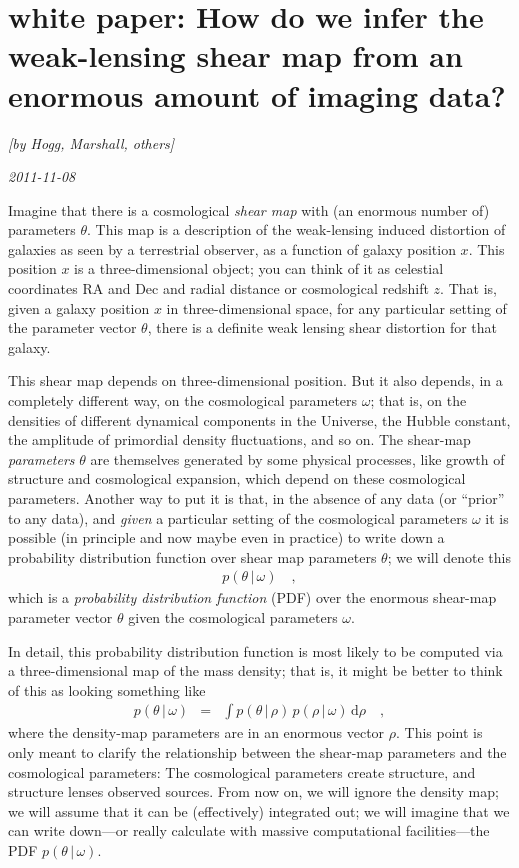 \documentclass[12pt, pdftex]{article}
\newcommand{\dd}{\mathrm{d}}
\newcommand{\given}{\,|\,}
\newcommand{\RA}{\mathrm{RA}}
\newcommand{\Dec}{\mathrm{Dec}}
\newcommand{\shearpars}{\theta}
\newcommand{\position}{x}
\newcommand{\cosmopars}{\omega}
\newcommand{\densitypars}{\rho}
\begin{document}
\section*{white paper: How do we infer the weak-lensing shear map from an enormous amount of imaging data?}

\noindent
\textsl{[by Hogg, Marshall, others]}

\noindent
\textsl{2011-11-08}

Imagine that there is a cosmological \emph{shear map} with (an
enormous number of) parameters $\shearpars$.  This map is a
description of the weak-lensing induced distortion of galaxies as seen
by a terrestrial observer, as a function of galaxy position
$\position$.  This position $\position$ is a three-dimensional object;
you can think of it as celestial coordinates $\RA$ and $\Dec$ and
radial distance or cosmological redshift $z$.  That is, given a galaxy
position $\position$ in three-dimensional space, for any particular
setting of the parameter vector $\shearpars$, there is a definite weak
lensing shear distortion for that galaxy.

This shear map depends on three-dimensional position.  But it also
depends, in a completely different way, on the cosmological parameters
$\cosmopars$; that is, on the densities of different dynamical
components in the Universe, the Hubble constant, the amplitude of
primordial density fluctuations, and so on.  The shear-map
\emph{parameters} $\shearpars$ are themselves generated by some
physical processes, like growth of structure and cosmological
expansion, which depend on these cosmological parameters.  Another way
to put it is that, in the absence of any data (or ``prior'' to any
data), and \emph{given} a particular setting of the cosmological
parameters $\cosmopars$ it is possible (in principle and now maybe
even in practice) to write down a probability distribution function
over shear map parameters $\shearpars$; we will denote this
\begin{eqnarray}\displaystyle
p(\shearpars\given\cosmopars)
\quad ,
\end{eqnarray}
which is a \emph{probability distribution function} (PDF) over the
enormous shear-map parameter vector $\shearpars$ given the
cosmological parameters $\cosmopars$.

In detail, this probability distribution function is most likely to be
computed via a three-dimensional map of the mass density; that is, it
might be better to think of this as looking something like
\begin{eqnarray}\displaystyle
p(\shearpars\given\cosmopars) &=& \int p(\shearpars\given\densitypars)\,p(\densitypars\given\cosmopars)\,\dd\densitypars
\quad ,
\end{eqnarray}
where the density-map parameters are in an enormous vector
$\densitypars$.  This point is only meant to clarify the relationship
between the shear-map parameters and the cosmological parameters: The
cosmological parameters create structure, and structure lenses
observed sources.  From now on, we will ignore the density map; we
will assume that it can be (effectively) integrated out; we will
imagine that we can write down---or really calculate with massive
computational facilities---the PDF $p(\shearpars\given\cosmopars)$.
\end{document}
